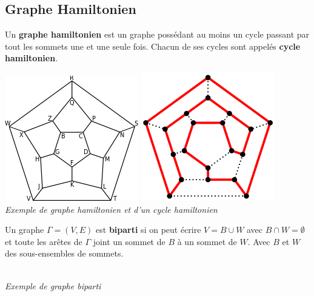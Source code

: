 \documentclass[11pt]{article}
\begin{document}
	\subsection{Graphe Hamiltonien}
		Un \textbf{graphe hamiltonien} est un graphe possédant au moins un cycle passant par tout les sommets une et une seule fois. Chacun de ses cycles sont appelés \textbf{cycle hamiltonien}.
		\begin{center}
			\includegraphics[scale=0.6]{hamiltonien.png}
			\qquad
			\includegraphics[scale=0.57]{hamiltonien2.png}\\
			\textit{Exemple de graphe hamiltonien et d'un cycle hamiltonien}
		\end{center}
		
		Un graphe $\Gamma = (V,E)$ est \textbf{biparti} si on peut écrire $V = B \cup W$ avec $B \cap W = \emptyset$ et toute les arêtes de $\Gamma$ joint un sommet de $B$ à un sommet de $W$. Avec $B$ et $W$ des sous-ensembles de sommets. %
		\begin{center}
			 \\
		\textit{Exemple de graphe biparti}
		\end{center}
			
\end{document}
